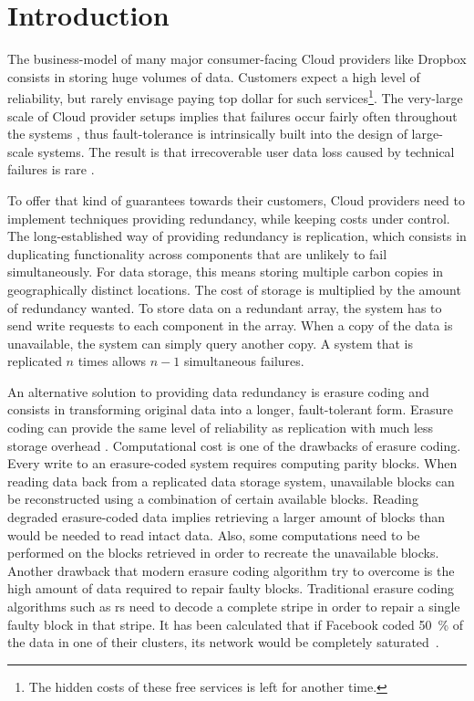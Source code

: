 \section{Introduction}
\label{sec:intro}

The business-model of many major consumer-facing Cloud providers like Dropbox consists in storing huge volumes of data. Customers expect a high level of reliability, but rarely envisage paying top dollar for such services\footnote{The hidden costs of these free services is left for another time.}. The very-large scale of Cloud provider setups implies that failures occur fairly often throughout the systems \autocite{failures-study}, thus fault-tolerance is intrinsically built into the design of large-scale systems. The result is that irrecoverable user data loss caused by technical failures is rare \autocite{racs}.


To offer that kind of guarantees towards their customers, Cloud providers need to implement techniques providing redundancy, while keeping costs under control. The long-established way of providing redundancy is replication, which consists in duplicating functionality across components that are unlikely to fail simultaneously. For data storage, this means storing multiple carbon copies in geographically distinct locations. The cost of storage is multiplied by the amount of redundancy wanted. To store data on a redundant array, the system has to send write requests to each component in the array. When a copy of the data is unavailable, the system can simply query another copy. A system that is replicated $n$ times allows $n-1$ simultaneous failures.

An alternative solution to providing data redundancy is erasure coding and consists in transforming original data into a longer, fault-tolerant form. Erasure coding can provide the same level of reliability as replication with much less storage overhead \autocite{Weatherspoon2002}.
Computational cost is one of the drawbacks of erasure coding.
Every write to an erasure-coded system requires computing parity blocks.
When reading data back from a replicated data storage system, unavailable blocks can be reconstructed using a combination of certain available blocks.
Reading degraded erasure-coded data implies retrieving a larger amount of blocks than would be needed to read intact data. Also, some computations need to be performed on the blocks retrieved in order to recreate the unavailable blocks.
Another drawback that modern erasure coding algorithm try to overcome is the high amount of data required to repair faulty blocks.
Traditional erasure coding algorithms such as \ac{rs} need to decode a complete stripe in order to repair a single faulty block in that stripe.
It has been calculated that if Facebook coded \SI{50}{\percent} of the data in one of their clusters, its network would be completely saturated~\autocite{XorbasVLDB}.

